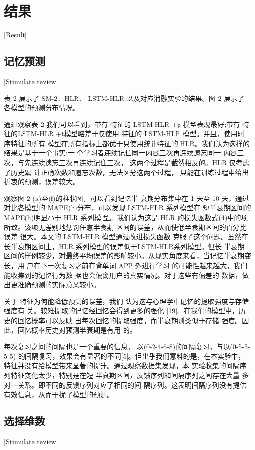 \chapter{结果}[Result]

\section{记忆预测}[Stimulate review]

表 2 展示了 SM-2、HLR、 LSTM-HLR 以及对应消融实验的结果。图 2 展示了各模型的预测分布情况。

通过观察表 2 我们可以看到，带有 特征的 LSTM-HLR +p 模型表现最好;带有 特 征的LSTM-HLR +t模型略差于仅使用 特征的 LSTM-HLR 模型。并且，使用时序特征的所有 模型在所有指标上都优于只使用统计特征的 HLR。我们认为这样的结果是基于一个事实:一 个学习者连续记住同一内容三次再连续遗忘同一 内容三次，与先连续遗忘三次再连续记住三次， 这两个过程是截然相反的。HLR 仅考虑了历史累 计正确次数和遗忘次数，无法区分这两个过程， 只能在训练过程中给出折衷的预测，误差较大。

观察图 2 (a)至(f)的柱状图，可以看到记忆半 衰期分布集中在 1 天至 10 天。通过对比各模型的 MAPE(h)分布，可以发现 LSTM-HLR 系列模型在 短半衰期区间的 MAPE(h)明显小于 HLR 系列模 型。我们认为这是 HLR 的损失函数式(4)中的项所致。该项无差别地惩罚任意半衰期 区间的误差，从而使低半衰期区间的百分比误差 很大。本文的 LSTM-HLR 模型通过改进损失函数 克服了这个问题。虽然在长半衰期区间上，HLR 系列模型的误差低于LSTM-HLR系列模型。但长 半衰期区间的样例较少，对最终平均误差的影响较小。从现实角度来看，当记忆半衰期变长，用 户在下一次复习之前在背单词 APP 外进行学习 的可能性越来越大，我们能收集到的记忆行为数 据也会偏离用户的真实情况。对于这些有偏差的 数据，做出更准确预测的实际意义较小。

关于 特征为何能降低预测的误差，我们 认为这与心理学中记忆的提取强度与存储强度有 关。较难提取的记忆经回忆会得到更多的强化 [19]。在我们的模型中，历史的回忆概率可以反映 出每次回忆的提取强度，而半衰期则类似于存储 强度。因此，回忆概率历史对预测半衰期是有用 的。

每次复习之间的间隔也是一个重要的信息。 以(0-2-4-6-8)的间隔复习，与以(0-5-5-5-5) 的间隔复习，效果会有显著的不同[5]。但出乎我们意料的是，在本实验中， 特征并没有给模型带来显著的提升。通过观察数据集发现，本 实验收集的间隔序列特征变化太少，特别是在短 半衰期区间，反馈序列和间隔序列之间存在大量 多对一关系。即不同的反馈序列对应了相同的间 隔序列。这表明间隔序列没有提供有效信息，从而干扰了模型的预测。

\section{选择维数}[Stimulate review]

